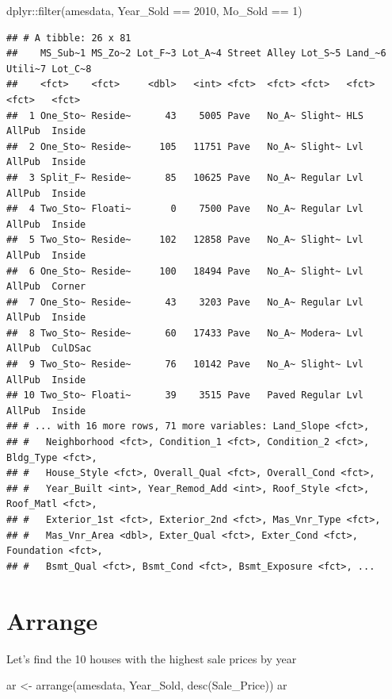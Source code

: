 \documentclass[
]{book}
\newenvironment{Shaded}{\begin{snugshade}}{\end{snugshade}}
\newcommand{\DecValTok}[1]{\textcolor[rgb]{0.00,0.00,0.81}{#1}}
\newcommand{\FunctionTok}[1]{\textcolor[rgb]{0.00,0.00,0.00}{#1}}
\newcommand{\NormalTok}[1]{#1}
\newcommand{\OtherTok}[1]{\textcolor[rgb]{0.56,0.35,0.01}{#1}}
\newcommand{\SpecialCharTok}[1]{\textcolor[rgb]{0.00,0.00,0.00}{#1}}
\theoremstyle{definition}
\theoremstyle{definition}
\theoremstyle{definition}
\theoremstyle{definition}
\theoremstyle{remark}
\begin{document}
\begin{Shaded}
\begin{Highlighting}[]
\NormalTok{dplyr}\SpecialCharTok{::}\FunctionTok{filter}\NormalTok{(amesdata, Year\_Sold }\SpecialCharTok{==} \DecValTok{2010}\NormalTok{, Mo\_Sold }\SpecialCharTok{==} \DecValTok{1}\NormalTok{)}
\end{Highlighting}
\end{Shaded}

\begin{verbatim}
## # A tibble: 26 x 81
##    MS_Sub~1 MS_Zo~2 Lot_F~3 Lot_A~4 Street Alley Lot_S~5 Land_~6 Utili~7 Lot_C~8
##    <fct>    <fct>     <dbl>   <int> <fct>  <fct> <fct>   <fct>   <fct>   <fct>  
##  1 One_Sto~ Reside~      43    5005 Pave   No_A~ Slight~ HLS     AllPub  Inside 
##  2 One_Sto~ Reside~     105   11751 Pave   No_A~ Slight~ Lvl     AllPub  Inside 
##  3 Split_F~ Reside~      85   10625 Pave   No_A~ Regular Lvl     AllPub  Inside 
##  4 Two_Sto~ Floati~       0    7500 Pave   No_A~ Regular Lvl     AllPub  Inside 
##  5 Two_Sto~ Reside~     102   12858 Pave   No_A~ Slight~ Lvl     AllPub  Inside 
##  6 One_Sto~ Reside~     100   18494 Pave   No_A~ Slight~ Lvl     AllPub  Corner 
##  7 One_Sto~ Reside~      43    3203 Pave   No_A~ Regular Lvl     AllPub  Inside 
##  8 Two_Sto~ Reside~      60   17433 Pave   No_A~ Modera~ Lvl     AllPub  CulDSac
##  9 Two_Sto~ Reside~      76   10142 Pave   No_A~ Slight~ Lvl     AllPub  Inside 
## 10 Two_Sto~ Floati~      39    3515 Pave   Paved Regular Lvl     AllPub  Inside 
## # ... with 16 more rows, 71 more variables: Land_Slope <fct>,
## #   Neighborhood <fct>, Condition_1 <fct>, Condition_2 <fct>, Bldg_Type <fct>,
## #   House_Style <fct>, Overall_Qual <fct>, Overall_Cond <fct>,
## #   Year_Built <int>, Year_Remod_Add <int>, Roof_Style <fct>, Roof_Matl <fct>,
## #   Exterior_1st <fct>, Exterior_2nd <fct>, Mas_Vnr_Type <fct>,
## #   Mas_Vnr_Area <dbl>, Exter_Qual <fct>, Exter_Cond <fct>, Foundation <fct>,
## #   Bsmt_Qual <fct>, Bsmt_Cond <fct>, Bsmt_Exposure <fct>, ...
\end{verbatim}

\hypertarget{arrange}{%
\section{Arrange}\label{arrange}}

Let's find the 10 houses with the highest sale prices by year

\begin{Shaded}
\begin{Highlighting}[]
\NormalTok{ar }\OtherTok{\textless{}{-}} \FunctionTok{arrange}\NormalTok{(amesdata, Year\_Sold, }\FunctionTok{desc}\NormalTok{(Sale\_Price))}
\NormalTok{ar}
\end{Highlighting}
\end{Shaded}
\end{document}
